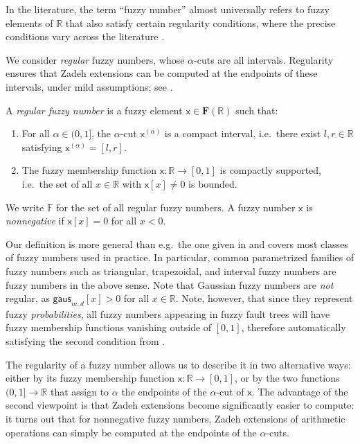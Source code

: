 \documentclass[runningheads]{llncs}
\newcommand{\myparagraph}[1]{\medskip\noindent{\bf #1}}
\newcommand{\fuzznum}{\mathbb{F}} %
\renewcommand{\emph}[1]{{\it #1}}
\begin{document}
\myparagraph{Regular fuzzy numbers.} In the literature, the term ``fuzzy number'' almost universally refers to fuzzy elements of $\mathbb{R}$ that also satisfy certain regularity conditions, where the precise conditions vary across the literature  \cite{dijkman1983fuzzy}. 

We consider \emph{regular} fuzzy numbers, whose $\alpha$-cuts are all intervals. Regularity ensures that Zadeh extensions can be computed at the endpoints of these intervals, under mild assumptions; see .


\begin{definition}\label{def:fuzzy-number}
    A \emph{regular fuzzy number} is a fuzzy element $\mathsf{x}\in\mathbf{F}(\mathbb{R})$ such that: 
    \begin{enumerate}
        \item For all $\alpha\in (0,1]$, the $\alpha$-cut $\mathsf{x}^{(\alpha)}$ is a compact interval, i.e.~there exist $l, r\in \mathbb{R}$ satisfying $\mathsf{x}^{(\alpha)} = [l,r]$. 
        \item The fuzzy membership function $\mathsf{x}: \mathbb{R} \to [0,1]$ is compactly supported, i.e.~the set of all $x\in \mathbb{R}$ with $\mathsf{x}[x]\neq 0$ is bounded. 
    \end{enumerate}
    We write $\fuzznum$ for the set of all regular fuzzy numbers.
    A fuzzy number $\mathsf{x}$ is \emph{nonnegative} if $\mathsf{x}[x]=0$ for all $x<0$. 
\end{definition}

Our definition is more general than e.g.~the one given in \cite{dubois1978operations} and covers most classes of fuzzy numbers used in practice.  
In particular, common parametrized
families of fuzzy numbers such as triangular, trapezoidal, and interval fuzzy numbers are fuzzy numbers in the above sense. 
Note that Gaussian fuzzy numbers are \emph{not} regular, as $\mathsf{gaus}_{m,d}[x] > 0$ for all $x \in \mathbb{R}$. 
Note, however, that since they represent fuzzy \emph{probabilities}, all fuzzy numbers appearing in fuzzy fault trees will have fuzzy membership functions vanishing outside of $[0,1]$, therefore automatically satisfying the second condition from .

The regularity of a fuzzy number allows us to describe it in two alternative ways: either by its fuzzy  membership function $\mathsf{x}\colon \mathbb{R} \rightarrow [0,1]$, or by the two functions $(0,1] \rightarrow \mathbb{R}$ that assign to $\alpha$ the endpoints of the $\alpha$-cut of $\mathsf{x}$. 
The advantage of the second viewpoint is that Zadeh extensions become significantly easier to compute: it turns out that for nonnegative fuzzy numbers, Zadeh extensions of arithmetic operations can simply be computed at the endpoints of the $\alpha$-cuts. 
\end{document}
